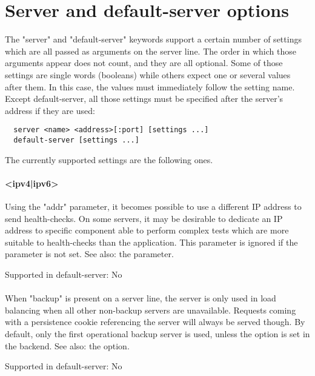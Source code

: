\chapter{Server and default-server options}
\label{chap:server_options}

The "server" and "default-server" keywords support a certain number of settings
which are all passed as arguments on the server line. The order in which those
arguments appear does not count, and they are all optional. Some of those
settings are single words (booleans) while others expect one or several values
after them. In this case, the values must immediately follow the setting name.
Except default-server, all those settings must be specified after the server's
address if they are used:

\begin{verbatim}
  server <name> <address>[:port] [settings ...]
  default-server [settings ...]
\end{verbatim}

The currently supported settings are the following ones.

\subsubsection[addr]{ <ipv4|ipv6>}
  Using the "addr" parameter, it becomes possible to use a different IP address
  to send health-checks. On some servers, it may be desirable to dedicate an IP
  address to specific component able to perform complex tests which are more
  suitable to health-checks than the application. This parameter is ignored if
  the  parameter is not set.
See also: the  parameter.

  Supported in default-server: No

\subsubsection[backup]{}
  When "backup" is present on a server line, the server is only used in load
  balancing when all other non-backup servers are unavailable. Requests coming
  with a persistence cookie referencing the server will always be served
  though. By default, only the first operational backup server is used, unless
  the  option is set in the backend.
See also: the 
  option.

  Supported in default-server: No

